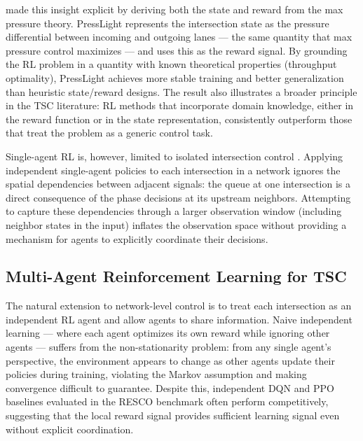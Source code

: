 \citet{wei2019presslight} made this insight explicit by deriving both the state and reward from the max pressure theory. PressLight represents the intersection state as the pressure differential between incoming and outgoing lanes — the same quantity that max pressure control maximizes — and uses this as the reward signal. By grounding the RL problem in a quantity with known theoretical properties (throughput optimality), PressLight achieves more stable training and better generalization than heuristic state/reward designs. The result also illustrates a broader principle in the TSC literature: RL methods that incorporate domain knowledge, either in the reward function or in the state representation, consistently outperform those that treat the problem as a generic control task.

Single-agent RL is, however, limited to isolated intersection control \citep{wei2019colight}. Applying independent single-agent policies to each intersection in a network ignores the spatial dependencies between adjacent signals: the queue at one intersection is a direct consequence of the phase decisions at its upstream neighbors. Attempting to capture these dependencies through a larger observation window (including neighbor states in the input) inflates the observation space without providing a mechanism for agents to explicitly coordinate their decisions.

\subsection{Multi-Agent Reinforcement Learning for TSC}
\label{sec:LiteratureReview_MARLTSC}

The natural extension to network-level control is to treat each intersection as an independent RL agent and allow agents to share information. Naive independent learning — where each agent optimizes its own reward while ignoring other agents — suffers from the non-stationarity problem: from any single agent's perspective, the environment appears to change as other agents update their policies during training, violating the Markov assumption and making convergence difficult to guarantee. Despite this, independent DQN and PPO baselines evaluated in the RESCO benchmark \citep{ault2021reinforcement} often perform competitively, suggesting that the local reward signal provides sufficient learning signal even without explicit coordination.

